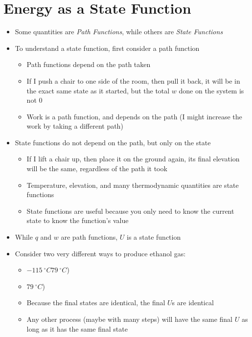 \documentclass[12pt, openany, letterpaper]{memoir}
\begin{document}
\section{Energy as a State Function}
\begin{itemize}
	\item Some quantities are \emph{Path Functions}, while others are \emph{State Functions}
	\item To understand a state function, first consider a path function
	      \begin{itemize}
		      \item Path functions depend on the path taken
		      \item If I push a chair to one side of the room, then pull it back, it will be in the exact same state as it started, but the total $w$ done on the system is not $0$
		      \item Work is a path function, and depends on the path (I might increase the work by taking a different path)
	      \end{itemize}
	\item State functions do not depend on the path, but only on the state
	      \begin{itemize}
		      \item If I lift a chair up, then place it on the ground again, its final elevation will be the same, regardless of the path it took
		      \item Temperature, elevation, and many thermodynamic quantities are state functions
		      \item State functions are useful because you only need to know the current state to know the function's value
	      \end{itemize}
	\item While $q$ and $w$ are path functions, $U$ is a state function
	\item Consider two very different ways to produce ethanol gas:
	      \begin{itemize}
		      \item {}$-115~^\circ C$$79~^\circ C$)
		      \item {}$79~^\circ C$)
		      \item Because the final states are identical, the final $U$s are identical
		      \item Any other process (maybe with many steps) will have the same final $U$ as long as it has the same final state
	      \end{itemize}
\end{itemize}
\end{document}
